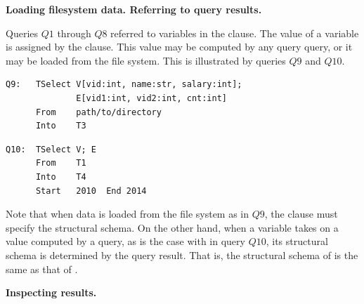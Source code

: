 {\bf Loading filesystem data.  Referring to query results.}

Queries $Q1$ through $Q8$ referred to \tg variables in the
 clause.  The value of a \tg variable is assigned by the
 clause.  This value may be computed by any \ql query
query, or it may be loaded from the file system.  This is illustrated
by queries $Q9$ and $Q10$.

\begin{verbatim}
Q9:   TSelect V[vid:int, name:str, salary:int]; 
              E[vid1:int, vid2:int, cnt:int]
      From    path/to/directory
      Into    T3
\end{verbatim}

\begin{verbatim}
Q10:  TSelect V; E
      From    T1
      Into    T4
      Start   2010  End 2014
\end{verbatim}

Note that when data is loaded from the file system as in $Q9$, the
 clause must specify the structural schema.  On the
other hand, when a \tg variable takes on a value computed by a query,
as is the case with  in query $Q10$, its structural schema
is determined by the query result.  That is, the structural schema of
 is the same as that of .

{\bf Inspecting results.}

